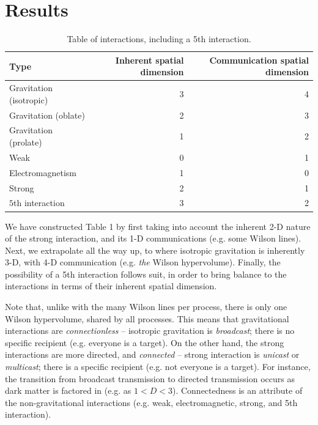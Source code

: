 \documentclass[12pt]{article}
\begin{document}
\section{Results}

\begin{table}
\caption{Table of interactions, including a 5th interaction.}
\begin{center}
\begin{tabular}{| l | r | r |}
  \hline
  Type & Inherent spatial dimension & Communication spatial dimension \\
\hline
\hline


Gravitation (isotropic) & 3  & 4\\

\rowcolor{Gray}
Gravitation (oblate) & 2 & 3\\

Gravitation (prolate) & 1 & 2\\

\rowcolor{Gray}
Weak & 0 & 1\\

Electromagnetism & 1 & 0 \\

\rowcolor{Gray}
Strong & 2 & 1\\

$5$th interaction & 3 & 2 \\
  \hline
\end{tabular}
\end{center}
\end{table}
We have constructed Table 1 by first taking into account the inherent 2-D nature of the strong interaction, and its 1-D communications (e.g. some Wilson lines).
Next, we extrapolate all the way up, to where isotropic gravitation is inherently 3-D, with 4-D communication (e.g. {\textit{the}} Wilson hypervolume). 
Finally, the possibility of a 5th interaction follows suit, in order to bring balance to the interactions in terms of their inherent spatial dimension.

Note that, unlike with the many Wilson lines per process, there is only one Wilson hypervolume, shared by all processes.
This means that gravitational interactions are {\textit{connectionless}} -- isotropic gravitation is {\textit{broadcast}}; there is no specific recipient (e.g. everyone is a target).
On the other hand, the strong interactions are more directed, and {\textit{connected}} -- strong interaction is {\textit{unicast}} or {\textit{multicast}}; there is a specific recipient (e.g. not everyone is a target).
For instance, the transition from broadcast transmission to directed transmission occurs as dark matter is factored in (e.g. as $1 < D < 3$).
Connectedness is an attribute of the non-gravitational interactions (e.g. weak, electromagnetic, strong, and 5th interaction).
\end{document}
